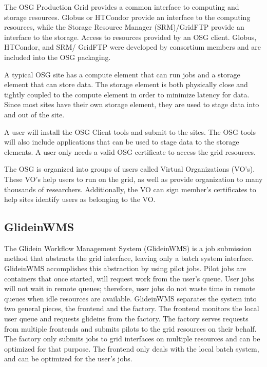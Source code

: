 The OSG Production Grid provides a common interface to computing and storage resources. Globus or HTCondor provide an interface to the computing resources, while the Storage Resource Manager (SRM)/GridFTP provide an interface to the storage.  Access to resources provided by an OSG client.  Globus, HTCondor, and SRM/ GridFTP were developed by consortium members and are included into the OSG packaging.

A typical OSG site has a compute element that can run jobs and a storage element that can store data.  The storage element is both physically close and tightly coupled to the compute element in order to minimize latency for data.  Since most sites have their own storage element, they are used to stage data into and out of the site.

A user will install the OSG Client tools and submit to the sites.  The OSG tools will also include applications that can be used to stage data to the storage elements.  A user only needs a valid OSG certificate to access the grid resources.

The OSG is organized into groups of users called Virtual Organizations (VO's).  These VO's help users to run on the grid, as well as provide organization to many thousands of researchers.  Additionally, the VO can sign member's certificates to help sites identify users as belonging to the VO.

\subsection{GlideinWMS}
The Glidein Workflow Management System (GlideinWMS) \cite{sfiligoi2008glideinwms} is a job submission method that abstracts the grid interface, leaving only a batch system interface.  GlideinWMS accomplishes this abstraction by using pilot jobs.  Pilot jobs are containers that once started, will request work from the user's queue.  User jobs will not wait in remote queues; therefore, user jobs do not waste time in remote queues when idle resources are available.  GlideinWMS separates the system into two general pieces, the frontend and the factory.  The frontend monitors the local user queue and requests glideins from the factory.  The factory serves requests from multiple frontends and submits pilots to the grid resources on their behalf.  The factory only submits jobs to grid interfaces on multiple resources and can be optimized for that purpose.  The frontend only deals with the local batch system, and can be optimized for the user's jobs.
 
